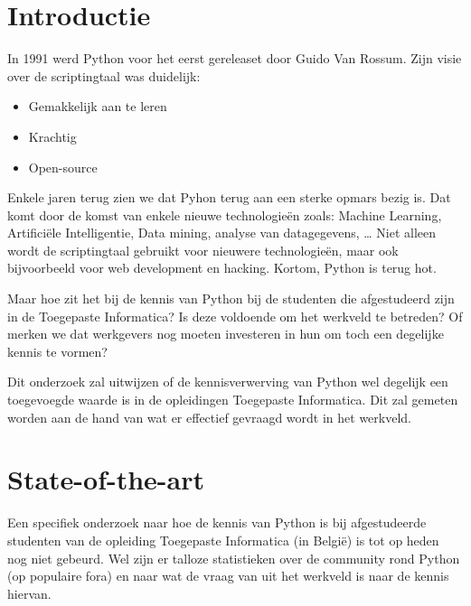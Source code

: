 
\section{Introductie} %
\label{sec:introductie}

In 1991 werd Python voor het eerst gereleaset door Guido Van Rossum. Zijn visie over de scriptingtaal was duidelijk:
\begin{itemize}
	\item Gemakkelijk aan te leren
	\item Krachtig
	\item Open-source
\end{itemize}
Enkele jaren terug zien we dat Pyhon terug aan een sterke opmars bezig is. Dat komt door de komst van enkele nieuwe technologieën zoals: Machine Learning, Artificiële Intelligentie, Data mining, analyse van datagegevens, … Niet alleen wordt de scriptingtaal gebruikt voor nieuwere technologieën, maar ook bijvoorbeeld voor web development en hacking. Kortom, Python is terug hot.
 
Maar hoe zit het bij de kennis van Python bij de studenten die afgestudeerd zijn in de Toegepaste Informatica? Is deze voldoende om het werkveld te betreden? Of merken we dat werkgevers nog moeten investeren in hun om toch een degelijke kennis te vormen? 

Dit onderzoek zal uitwijzen of de kennisverwerving van Python wel degelijk een toegevoegde waarde is in de opleidingen Toegepaste Informatica. Dit zal gemeten worden aan de hand van wat er effectief gevraagd wordt in het werkveld.


\section{State-of-the-art}
\label{sec:state-of-the-art}

Een specifiek onderzoek naar hoe de kennis van Python is bij afgestudeerde studenten van de opleiding Toegepaste Informatica (in België) is tot op heden nog niet gebeurd. Wel zijn er talloze statistieken over de community rond Python (op populaire fora) en naar wat de vraag van uit het werkveld is naar de kennis hiervan.  

